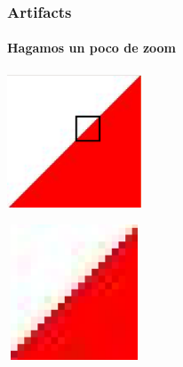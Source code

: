 \documentclass{beamer}
\begin{document}
\begin{frame}
    \frametitle{Artifacts}
    \framesubtitle{Hagamos un poco de zoom}
    \begin{minipage}[t]{0.4\linewidth}
        \begin{center}
            \includegraphics[width=4cm, height=4cm]{fig/borde_jpeg_area.png}\\
        \end{center}
    \end{minipage}
    \hfill
    \begin{minipage}[t]{0.4\linewidth}
        \begin{center}
        \includegraphics[width=4cm, height=4cm]{fig/borde_jpeg_zoom.png}\\
        \end{center}
    \end{minipage}
\end{frame}
\end{document}
